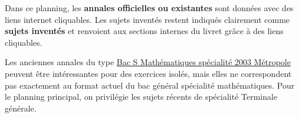 \documentclass[11pt,a4paper]{article}
\begin{document}
\begin{alerte}
Dans ce planning, les \textbf{annales officielles ou existantes} sont données avec des liens internet cliquables.  
Les sujets inventés restent indiqués clairement comme \textbf{sujets inventés} et renvoient aux sections internes du livret grâce à des liens cliquables.
\end{alerte}

\begin{alerte}
Les anciennes annales du type \href{https://www.sujetdebac.fr/annales/s-mathematiques-specialite-2003-metropole}{Bac S Mathématiques spécialité 2003 Métropole} peuvent être intéressantes pour des exercices isolés, mais elles ne correspondent pas exactement au format actuel du bac général spécialité mathématiques. Pour le planning principal, on privilégie les sujets récents de spécialité Terminale générale.
\end{alerte}
\end{document}
